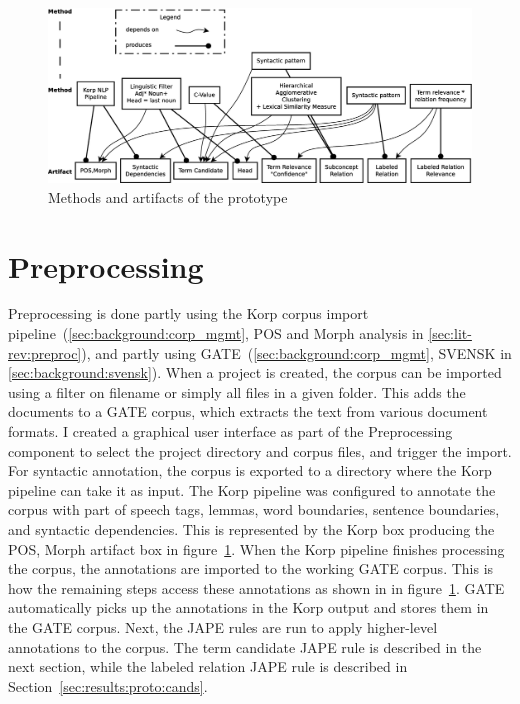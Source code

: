 \documentclass[a4paper]{report}
\begin{document}
\begin{figure}
  \includegraphics[width=\textwidth]{graphics/method-element-dependencies.eps}
  \caption{Methods and artifacts of the prototype}
  \label{fig:method-artifact}
\end{figure}

\section{Preprocessing}
\label{sec:results:proto:prepr}
Preprocessing is done partly using the Korp corpus import pipeline~(\ref{sec:background:corp_mgmt}, POS and Morph analysis in \ref{sec:lit-rev:preproc}), and partly using GATE~(\ref{sec:background:corp_mgmt}, SVENSK in \ref{sec:background:svensk}).
When a project is created, the corpus can be imported using a filter on filename or simply all files in a given folder.
This adds the documents to a GATE corpus, which extracts the text from various document formats.
I created a graphical user interface as part of the Preprocessing component to select the project directory and corpus files, and trigger the import.
For syntactic annotation, the corpus is exported to a directory where the Korp pipeline can take it as input.
The Korp pipeline was configured to annotate the corpus with part of speech tags, lemmas, word boundaries, sentence boundaries, and syntactic dependencies.
This is represented by the Korp box producing the POS, Morph artifact box in figure~\ref{fig:method-artifact}.
When the Korp pipeline finishes processing the corpus, the annotations are imported to the working GATE corpus.
This is how the remaining steps access these annotations as shown in in figure~\ref{fig:method-artifact}.
GATE automatically picks up the annotations in the Korp output and stores them in the GATE corpus.
Next, the JAPE rules are run to apply higher-level annotations to the corpus.
The term candidate JAPE rule is described in the next section, while the labeled relation JAPE rule is described in Section~\ref{sec:results:proto:cands}.
\end{document}
